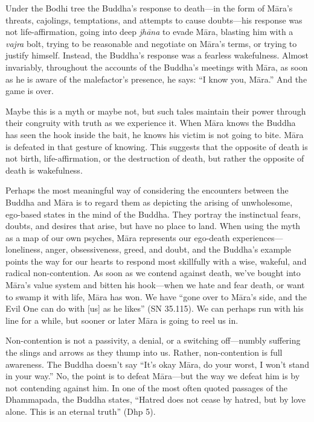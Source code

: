 
Under the Bodhi tree the Buddha's response to death---in the form of 
Māra's threats, cajolings, temptations, and attempts to cause 
doubts---his response was not life-affirmation, going into deep 
\emph{jhāna} to evade Māra, blasting him with a \emph{vajra} bolt, 
trying to be reasonable and negotiate on Māra's terms, or trying to 
justify himself. Instead, the Buddha's response was a fearless 
wakefulness. Almost invariably, throughout the accounts of the Buddha's 
meetings with Māra, as soon as he is aware of the malefactor's 
presence, he says: ``I know you, Māra.'' And the game is over.

Maybe this is a myth or maybe not, but such tales maintain their power 
through their congruity with truth as we experience it. When Māra 
knows the Buddha has seen the hook inside the bait, he knows his victim 
is not going to bite. Māra is defeated in that gesture of knowing. 
This suggests that the opposite of death is not birth, 
life-affirmation, or the destruction of death, but rather the opposite 
of death is wakefulness.

Perhaps the most meaningful way of considering the encounters between 
the Buddha and Māra is to regard them as depicting the arising of 
unwholesome, ego-based states in the mind of the Buddha. They portray 
the instinctual fears, doubts, and desires that arise, but have no 
place to land. When using the myth as a map of our own psyches, Māra 
represents our ego-death experiences---loneliness, anger, 
obsessiveness, greed, and doubt, and the Buddha's example points the 
way for our hearts to respond most skillfully with a wise, wakeful, and 
radical non-contention. As soon as we contend against death, we've 
bought into Māra's value system and bitten his hook---when we hate and 
fear death, or want to swamp it with life, Māra has won. We have 
``gone over to Māra's side, and the Evil One can do with [us] as he 
likes'' (SN 35.115). We can perhaps run with his line for a while, but 
sooner or later Māra is going to reel us in.

Non-contention is not a passivity, a denial, or a switching 
off---numbly suffering the slings and arrows as they thump into us. 
Rather, non-contention is full awareness. The Buddha doesn't say ``It's 
okay Māra, do your worst, I won't stand in your way.'' No, the point 
is to defeat Māra---but the way we defeat him is by not contending 
against him. In one of the most often quoted passages of the 
Dhammapada, the Buddha states, ``Hatred does not cease by hatred, but 
by love alone. This is an eternal truth'' (Dhp 5).

